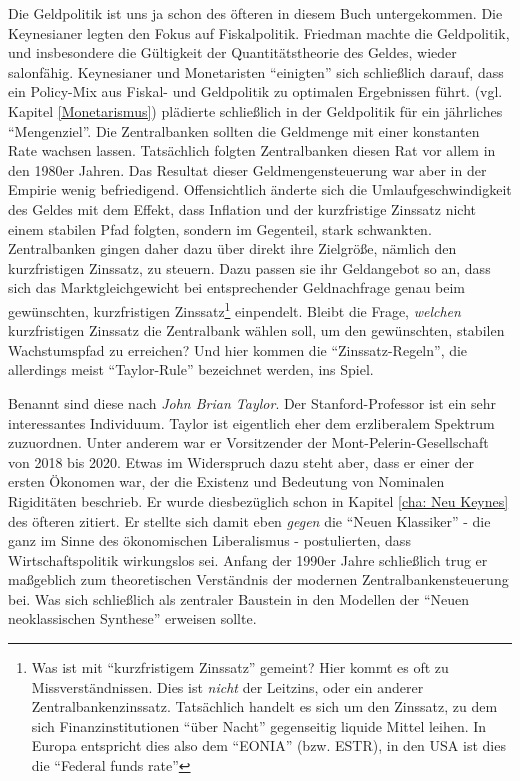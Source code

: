 Die Geldpolitik ist uns ja schon des öfteren in diesem Buch untergekommen. Die Keynesianer legten den Fokus auf Fiskalpolitik. Friedman machte die Geldpolitik, und insbesondere die Gültigkeit der Quantitätstheorie des Geldes, wieder salonfähig. Keynesianer und Monetaristen "`einigten"' sich schließlich darauf, dass ein Policy-Mix aus Fiskal- und Geldpolitik zu optimalen Ergebnissen führt. \textcite{Friedman1960} (vgl. Kapitel \ref{Monetarismus}) plädierte schließlich in der Geldpolitik für ein jährliches "`Mengenziel"'. Die Zentralbanken sollten die Geldmenge mit einer konstanten Rate wachsen lassen. Tatsächlich folgten Zentralbanken diesen Rat vor allem in den 1980er Jahren. Das Resultat dieser Geldmengensteuerung war aber in der Empirie wenig befriedigend. Offensichtlich änderte sich die Umlaufgeschwindigkeit des Geldes mit dem Effekt, dass Inflation und der kurzfristige Zinssatz nicht einem stabilen Pfad folgten, sondern im Gegenteil, stark schwankten. Zentralbanken gingen daher dazu über direkt ihre Zielgröße, nämlich den kurzfristigen Zinssatz, zu steuern. Dazu passen sie ihr Geldangebot so an, dass sich das Marktgleichgewicht bei entsprechender Geldnachfrage genau beim gewünschten, kurzfristigen Zinssatz\footnote{Was ist mit "`kurzfristigem Zinssatz"' gemeint? Hier kommt es oft zu Missverständnissen. Dies ist \textit{nicht} der Leitzins, oder ein anderer Zentralbankenzinssatz. Tatsächlich handelt es sich um den Zinssatz, zu dem sich Finanzinstitutionen "`über Nacht"' gegenseitig liquide Mittel leihen. In Europa entspricht dies also dem "`EONIA"' (bzw. ESTR), in den USA ist dies die "`Federal funds rate"'} einpendelt. Bleibt die Frage, \textit{welchen} kurzfristigen Zinssatz die Zentralbank wählen soll, um den gewünschten, stabilen Wachstumspfad zu erreichen? Und hier kommen die "`Zinssatz-Regeln"', die allerdings meist "`Taylor-Rule"' bezeichnet werden, ins Spiel.

Benannt sind diese nach \textit{John Brian Taylor}. Der Stanford-Professor ist ein sehr interessantes Individuum. Taylor ist eigentlich eher dem erzliberalem Spektrum zuzuordnen. Unter anderem war er Vorsitzender der Mont-Pelerin-Gesellschaft von 2018 bis 2020. Etwas im Widerspruch dazu steht aber, dass er einer der ersten Ökonomen war, der die Existenz und Bedeutung von Nominalen Rigiditäten beschrieb. Er wurde diesbezüglich schon in Kapitel \ref{cha: Neu Keynes} des öfteren zitiert. Er stellte sich damit eben \textit{gegen} die "`Neuen Klassiker"' - die ganz im Sinne des ökonomischen Liberalismus - postulierten, dass Wirtschaftspolitik wirkungslos sei. Anfang der 1990er Jahre schließlich trug er maßgeblich zum theoretischen Verständnis der modernen Zentralbankensteuerung bei. Was sich schließlich als zentraler Baustein in den Modellen der "`Neuen neoklassischen Synthese"' erweisen sollte.


